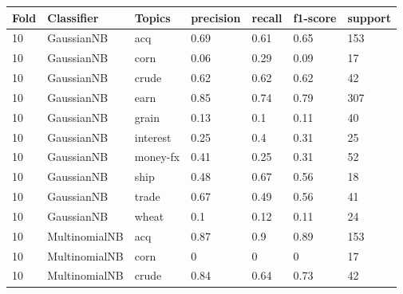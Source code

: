 \documentclass{article}
\begin{document}
\begin{table}[h]
\begin{tabular}{lllllll}
\textbf{Fold} & \textbf{Classifier}    & \textbf{Topics} & \textbf{precision} & \textbf{recall} & \textbf{f1-score} & \textbf{support} \\ \hline
10            & GaussianNB             & acq             & 0.69               & 0.61            & 0.65              & 153              \\
10            & GaussianNB             & corn            & 0.06               & 0.29            & 0.09              & 17               \\
10            & GaussianNB             & crude           & 0.62               & 0.62            & 0.62              & 42               \\
10            & GaussianNB             & earn            & 0.85               & 0.74            & 0.79              & 307              \\
10            & GaussianNB             & grain           & 0.13               & 0.1             & 0.11              & 40               \\
10            & GaussianNB             & interest        & 0.25               & 0.4             & 0.31              & 25               \\
10            & GaussianNB             & money-fx        & 0.41               & 0.25            & 0.31              & 52               \\
10            & GaussianNB             & ship            & 0.48               & 0.67            & 0.56              & 18               \\
10            & GaussianNB             & trade           & 0.67               & 0.49            & 0.56              & 41               \\
10            & GaussianNB             & wheat           & 0.1                & 0.12            & 0.11              & 24               \\
10            & MultinomialNB          & acq             & 0.87               & 0.9             & 0.89              & 153              \\
10            & MultinomialNB          & corn            & 0                  & 0               & 0                 & 17               \\
10            & MultinomialNB          & crude           & 0.84               & 0.64            & 0.73              & 42               \\

\end{tabular}
\end{table}
\end{document}
